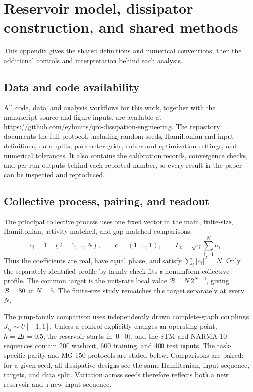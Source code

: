 \appendix
\raggedbottom

\section{Reservoir model, dissipator construction, and shared methods}
\label{app:shared}
\label{sec:methods}

This appendix gives the shared definitions and numerical conventions, then
the additional controls and interpretation behind each analysis.

\subsection{Data and code availability}

All code, data, and analysis workflows for this work, together with the
manuscript source and figure inputs, are available at
\url{https://github.com/eybmits/qrc-dissipation-engineering}. The repository
documents the full protocol, including random seeds, Hamiltonian and input
definitions, data splits, parameter grids, solver and optimization settings,
and numerical tolerances. It also contains the calibration records,
convergence checks, and per-run outputs behind each reported number, so every
result in the paper can be inspected and reproduced.

\subsection{Collective process, pairing, and readout}
\label{app:collective-process}

The principal collective process uses one fixed vector in the main,
finite-size, Hamiltonian, activity-matched, and gap-matched comparisons:
\[
  c_i=1\quad(i=1,\ldots,N),\qquad
  \boldsymbol c=(1,\ldots,1),\qquad
  L_{\mathrm c}=\sqrt{\gamma}\sum_{i=1}^{N}\sigma_i^- .
\]
Thus the coefficients are real, have equal phase, and satisfy
\(\sum_i|c_i|^2=N\).  Only the separately identified profile-by-family check
fits a nonuniform collective profile.  The common target is the unit-rate
local value \(\mathcal B=N\,2^{N-1}\), giving \(\mathcal B=80\) at \(N=5\).
The finite-size study rematches this target separately at every \(N\).

The jump-family comparison uses independently drawn complete-graph couplings
\(J_{ij}\sim U[-1,1]\).  Unless a control explicitly changes an operating
point, \(h=\Delta t=0.5\), the reservoir starts in
\(\lvert0\cdots0\rangle\), and the STM and NARMA-10 sequences contain 200
washout, 600 training, and 400 test inputs. The task-specific parity and
MG-150 protocols are stated below. Comparisons are paired: for a given seed,
all dissipative designs see the same Hamiltonian, input sequence, targets,
and data split.  Variation across seeds therefore reflects both a new
reservoir and a new input sequence.

